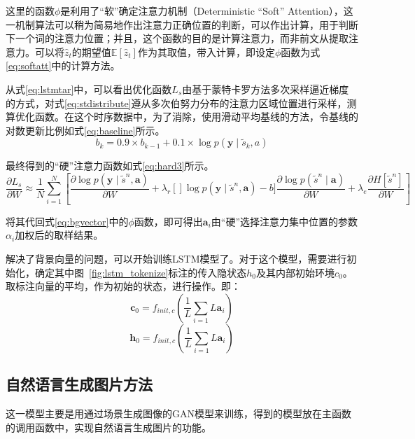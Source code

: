 这里的函数$\phi$是利用了“软”确定注意力机制（Deterministic “Soft” Attention），这一机制算法可以稍为简易地作出注意力正确位置的判断，可以作出计算，用于判断下一个词的注意力位置；并且，这个函数的目的是计算注意力，而非前文从提取注意力。可以将$\hat{z}_t$的期望值$\mathbb{E} [\hat{z}_t]$作为其取值，带入计算，即设定$\phi$函数为式\eqref{eq:softatt}中的计算方法。

从式\eqref{eq:lstmtar}中，可以看出优化函数$L_s$由基于蒙特卡罗方法多次采样逼近梯度的方式，对式\eqref{eq:stdistribute}遵从多次伯努力分布的注意力区域位置进行采样，测算优化函数。在这个时序数据中，为了消除，使用滑动平均基线的方法，令基线的对数更新比例如式\eqref{eq:baseline}所示。
\begin{equation}
    \label{eq:baseline}
    b_k = 0.9 \times b_{k-1} + 0.1 \times \log p(\textbf{y} \mid \tilde{s}_k, a)
\end{equation}

最终得到的“硬”注意力函数如式\eqref{eq:hard3}所示。
\begin{equation}
    \frac{\partial L_s}{\partial W} \approx \frac{1}{N} \sum_{i=1}^N\left[\frac{\partial \log p(\textbf{y}\mid \tilde{s}^n,\textbf{a})}{\partial W} + \lambda_r[]\log p(\textbf{y}\mid \tilde{s}^n,\textbf{a})-b] \frac{\partial \log p(\tilde{s}^n \mid \textbf{a})}{\partial W} +\lambda_e\frac{\partial H[\tilde{s}^n]}{\partial W}\right]
    \label{eq:hard3}
\end{equation}

将其代回式\eqref{eq:bgvector}中的$\phi$函数，即可得出${\textbf{a}_i}$由“硬”选择注意力集中位置的参数${\alpha_i}$加权后的取样结果。

解决了背景向量的问题，可以开始训练LSTM模型了。对于这个模型，需要进行初始化，确定其中图~\ref{fig:lstm_tokenize}标注的传入隐状态$h_0$及其内部初始环境$c_0$。取标注向量的平均，作为初始的状态，进行操作。即：
$$\textbf{c}_0 = f_{init,c}\left(\frac{1}{L}\sum_{i=1}{L}\textbf{a}_i\right)$$
$$\textbf{h}_0 = f_{init,c}\left(\frac{1}{L}\sum_{i=1}{L}\textbf{a}_i\right)$$

\subsection{自然语言生成图片方法}
这一模型主要是用通过场景生成图像的GAN模型来训练，得到的模型放在主函数的调用函数中，实现自然语言生成图片的功能。

